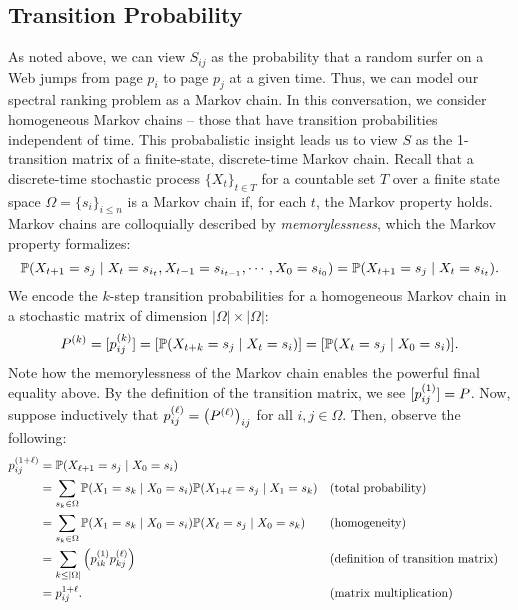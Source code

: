\documentclass[../exploring-pagerank.tex]{subfiles}
\begin{document}
	\subsection{Transition Probability}
	As noted above, we can view $S_{ij}$ as the probability that a random surfer on a Web jumps from page $p_i$ to page $p_j$ at a given time. Thus, we can model our spectral ranking problem as a Markov chain. In this conversation, we consider homogeneous Markov chains -- those that have transition probabilities independent of time. This probabalistic insight leads us to view $S$ as the 1-transition matrix of a finite-state, discrete-time Markov chain. Recall that a discrete-time stochastic process $\{X_t\}_{t \in T}$ for a countable set $T$ over a finite state space $\Omega = \{s_i\}_{i\leq n}$ is a Markov chain if, for each $t$, the Markov property holds. Markov chains are colloquially described by \textit{memorylessness}, which the Markov property formalizes:
	\begin{equation*}
		\mathbb{P}(X_{t+1} = s_j \mid X_t = s_{i_t}, X_{t-1} = s_{i_{t-1}},\cdots, X_0 = s_{i_0}) = \mathbb{P}(X_{t+1} = s_j \mid X_t=s_{i_{t}}).
	\end{equation*}
	 We encode the $k$-step transition probabilities for a homogeneous Markov chain in a stochastic matrix of dimension $|\Omega| \times |\Omega|$:
	\begin{equation}
		P^{(k)} = [ p^{(k)}_{ij} ] = [ \mathbb{P}(X_{t+k} = s_j \mid X_t = s_i) ] = [ \mathbb{P}(X_{t} = s_j \mid X_0 = s_i) ].
	\end{equation}
	Note how the memorylessness of the Markov chain enables the powerful final equality above. By the definition of the transition matrix, we see $ [ p^{(1)}_{ij} ] = P$. Now, suppose inductively that $p^{(\ell)}_{ij} = \left( P^{(\ell)} \right)_{ij}$ for all $i, j \in \Omega$. Then, observe the following:
	\begin{align*}
		p^{(1+\ell)}_{ij} &= \mathbb{P}(X_{\ell+1} = s_j \mid X_0 = s_i) \\
		&= \sum_{s_k\in\Omega}{\mathbb{P}(X_1 = s_k \mid X_0 = s_i) \mathbb{P}(X_{1+\ell} = s_j \mid X_1 = s_k)} && \text{(total probability)} \\
		&= \sum_{s_k\in\Omega}{\mathbb{P}(X_1 = s_k \mid X_0 = s_i) \mathbb{P}(X_{\ell} = s_j \mid X_0 = s_k)} && \text{(homogeneity)} \\
		&= \sum_{k\leq |\Omega|}{\left( p^{(1)}_{ik} p^{(\ell)}_{kj} \right)} && \text{(definition of transition matrix)}\\
		&= p^{1+\ell}_{ij}. && \text{(matrix multiplication)}
	\end{align*}
\end{document}

